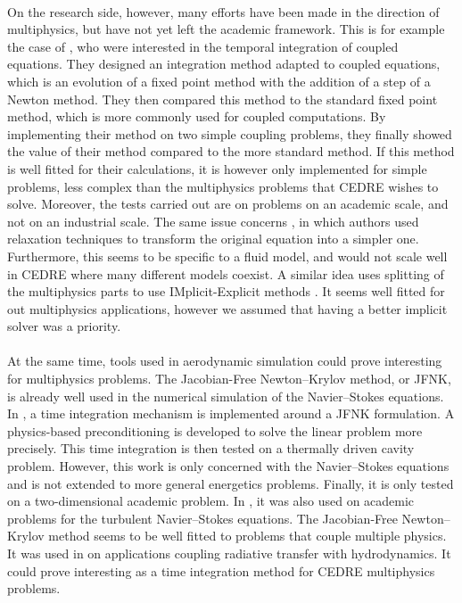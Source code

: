     \paragraph{}
    On the research side, however, many efforts have been made in the direction of multiphysics, but have not yet left the academic framework.
    This is for example the case of \cite{WongKwokHorneEtAl2019}, who were interested in the temporal integration of coupled equations.
    They designed an integration method adapted to coupled equations, which is an evolution of a fixed point method with the addition of a step of a Newton method.
    They then compared this method to the standard fixed point method, which is more commonly used for coupled computations.
    By implementing their method on two simple coupling problems, they finally showed the value of their method compared to the more standard method.
    If this method is well fitted for their calculations, it is however only implemented for simple problems, less complex than the multiphysics problems that CEDRE wishes to solve.
    Moreover, the tests carried out are on problems on an academic scale, and not on an industrial scale.
    The same issue concerns \cite{CouletteFranckHelluyEtAl2019}, in which authors used relaxation techniques to transform the original equation into a simpler one.
    Furthermore, this seems to be specific to a fluid model, and would not scale well in CEDRE where many different models coexist.
    A similar idea uses splitting of the multiphysics parts to use IMplicit-Explicit methods \cite{HuangPaznerPerssonEtAl2020}.
    It seems well fitted for out multiphysics applications, however we assumed that having a better implicit solver was a priority.

    \paragraph{}
    At the same time, tools used in aerodynamic simulation could prove interesting for multiphysics problems.
    The Jacobian-Free Newton--Krylov method, or JFNK, is already well used in the numerical simulation of the Navier--Stokes equations.
    In \cite{ParkNourgalievMartineauEtAl2009}, a time integration mechanism is implemented around a JFNK formulation.
    A physics-based preconditioning is developed to solve the linear problem more precisely.
    This time integration is then tested on a thermally driven cavity problem.
    However, this work is only concerned with the Navier--Stokes equations and is not extended to more general energetics problems.
    Finally, it is only tested on a two-dimensional academic problem.
    In \cite{ContentOuttierCinnella2013}, it was also used on academic problems for the turbulent Navier--Stokes equations.
    The Jacobian-Free Newton--Krylov method seems to be well fitted to problems that couple multiple physics.
    It was used in \cite{Turpault2003} on applications coupling radiative transfer with hydrodynamics.
    It could prove interesting as a time integration method for CEDRE multiphysics problems.

